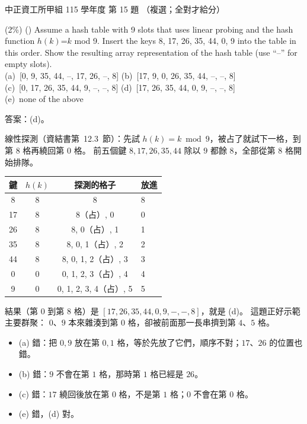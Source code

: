 \begin{pastexam}[label={px:ccu-115-swa-05}]{中正資工所甲組 115 學年度 第 15 題}
（複選；全對才給分）

(2\%) (\qquad) Assume a hash table with 9 slots that uses linear probing and the hash function
$h(k)$=$k$ mod 9. Insert the keys 8, 17, 26, 35, 44, 0, 9 into the table in this order. Show the
resulting array representation of the hash table (use ``--'' for empty slots).\\
(a)~[0, 9, 35, 44, --, 17, 26, --, 8] \qquad (b)~[17, 9, 0, 26, 35, 44, --, --, 8]\\
(c)~[0, 17, 26, 35, 44, 9, --, --, 8] \qquad (d)~[17, 26, 35, 44, 0, 9, --, --, 8]\\
(e)~none of the above
\end{pastexam}

\begin{pastsoln}
答案：(d)。

線性探測（資結書第~12.3~節）：先試 $h(k) = k \bmod 9$，被占了就試下一格，到第 $8$ 格再繞回第 $0$ 格。
前五個鍵 $8, 17, 26, 35, 44$ 除以 $9$ 都餘 $8$，全部從第 $8$ 格開始排隊。
\begin{center}
\small
\begin{tabular}{cccl}
\toprule
鍵 & $h(k)$ & 探測的格子 & 放進 \\
\midrule
8 & 8 & 8 & 8 \\
17 & 8 & 8（占）, 0 & 0 \\
26 & 8 & 8, 0（占）, 1 & 1 \\
35 & 8 & 8, 0, 1（占）, 2 & 2 \\
44 & 8 & 8, 0, 1, 2（占）, 3 & 3 \\
0 & 0 & 0, 1, 2, 3（占）, 4 & 4 \\
9 & 0 & 0, 1, 2, 3, 4（占）, 5 & 5 \\
\bottomrule
\end{tabular}
\end{center}
結果（第 $0$ 到第 $8$ 格）是 $[17, 26, 35, 44, 0, 9, -, -, 8]$，就是 (d)。 這題正好示範主要群聚：
$0$、$9$ 本來雜湊到第 $0$ 格，卻被前面那一長串擠到第 $4$、$5$ 格。
\begin{itemize}
\item (a) 錯：把 $0, 9$ 放在第 $0, 1$ 格，等於先放了它們，順序不對；$17$、$26$ 的位置也錯。
\item (b) 錯：$9$ 不會在第 $1$ 格，那時第 $1$ 格已經是 $26$。
\item (c) 錯：$17$ 繞回後放在第 $0$ 格，不是第 $1$ 格；$0$ 不會在第 $0$ 格。
\item (e) 錯，(d) 對。
\end{itemize}
\end{pastsoln}
